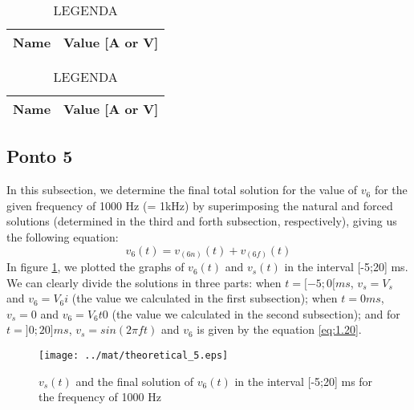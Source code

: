 \begin{table}[H]
  \centering
  \begin{tabular}{|l|r|}
    \hline    
    {\bf Name} & {\bf Value [A or V]} \\ \hline
    
  \end{tabular}
  \caption{LEGENDA}
  \label{tab:mat4}
\end{table}

\begin{table}[H]
  \centering
  \begin{tabular}{|l|r|}
    \hline    
    {\bf Name} & {\bf Value [A or V]} \\ \hline
    
  \end{tabular}
  \caption{LEGENDA}
  \label{tab:mat4a}
\end{table}



\subsection{Ponto 5}
In this subsection, we determine the final total solution for the value of $v_6$ for the given frequency of 1000 Hz (= 1kHz) by superimposing the natural and forced solutions (determined in the third and forth subsection, respectively), giving us the following equation:
\begin{equation}
v_6(t) = v_(6n)(t) + v_(6f)(t)
\label{eq:1.20}
\end{equation}
In figure \ref{fig:mat4}, we plotted the graphs of $v_6(t)$ and $v_s(t)$ in the interval [-5;20] ms. We can clearly divide the solutions in three parts: when $t=[-5;0[ ms$, $v_s = V_s$ and $v_6 = V_6i$ (the value we calculated in the first subsection); when $t=0 ms$, $v_s = 0$ and $v_6 = V_6t0$ (the value we calculated in the second subsection); and for $t=]0;20] ms$, $v_s = sin(2\pi f t)$ and $v_6$ is given by the equation \ref{eq:1.20}.

\begin{figure}[H] \centering
\texttt{[image: ../mat/theoretical\_5.eps]}
\caption{$v_s(t)$ and the final solution of $v_6(t)$ in the interval [-5;20] ms for the frequency of 1000 Hz}
\label{fig:mat4}
\end{figure}


